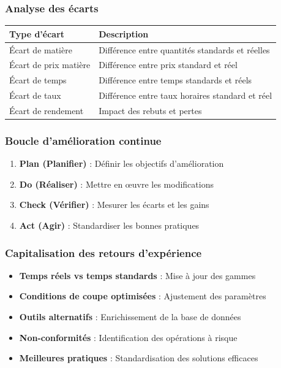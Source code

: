 \documentclass{article}
\begin{document}
\begin{table}[h]
\subsubsection{Analyse des écarts}

\begin{table}[h]
\centering
\begin{tabular}{|p{}|p{}|}
\hline
\textbf{Type d'écart} & \textbf{Description} \\
\hline
Écart de matière & Différence entre quantités standards et réelles \\
Écart de prix matière & Différence entre prix standard et réel \\
Écart de temps & Différence entre temps standards et réels \\
Écart de taux & Différence entre taux horaires standard et réel \\
Écart de rendement & Impact des rebuts et pertes \\
\hline
\end{tabular}
\end{table}

\subsubsection{Boucle d'amélioration continue}

\begin{tcolorbox}[colback=orangeclair, colframe=orange!70!black, title=Cycle PDCA d'amélioration des gammes]
\begin{enumerate}
    \item \textbf{Plan (Planifier)} : Définir les objectifs d'amélioration
    \item \textbf{Do (Réaliser)} : Mettre en œuvre les modifications
    \item \textbf{Check (Vérifier)} : Mesurer les écarts et les gains
    \item \textbf{Act (Agir)} : Standardiser les bonnes pratiques
\end{enumerate}
\end{tcolorbox}

\subsubsection{Capitalisation des retours d'expérience}

\begin{itemize}
    \item \textbf{Temps réels vs temps standards} : Mise à jour des gammes
    \item \textbf{Conditions de coupe optimisées} : Ajustement des paramètres
    \item \textbf{Outils alternatifs} : Enrichissement de la base de données
    \item \textbf{Non-conformités} : Identification des opérations à risque
    \item \textbf{Meilleures pratiques} : Standardisation des solutions efficaces
\end{itemize}


\end{table}
\end{document}
